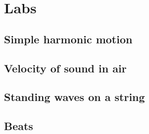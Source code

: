 \section{Labs}

\subsection{Simple harmonic motion}

\subsection{Velocity of sound in air}

\subsection{Standing waves on a string}

\subsection{Beats}

